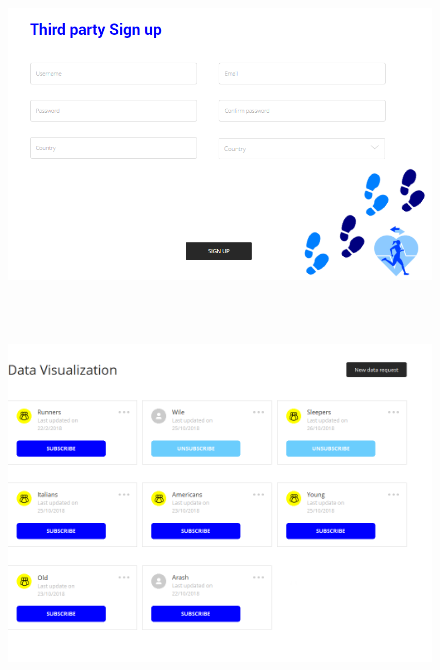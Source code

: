 \begin{figure}[H]
\centering
  \includegraphics[width=12cm,height=9cm]{resources/Screen/ThirdPartySignup.png}
  \label{fig:WebApp SignUp}
\end{figure}

\begin{figure}[H]
\centering
  \includegraphics[width=12cm,height=9cm]{resources/Screen/DataVisualization.png}
  \label{fig:WebApp data visualization}
\end{figure}


